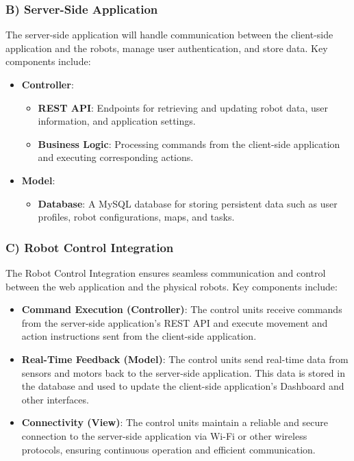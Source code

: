 \subsubsection{B) Server-Side Application}
\vspace{-2.5mm}
The server-side application will handle communication between the client-side application and the robots, manage user authentication, and store data. Key components include:
\vspace{-2mm}
\begin{itemize}
    \item \textbf{Controller}:
    \begin{itemize}
    \vspace{-1mm}
        \item \textbf{REST API}: Endpoints for retrieving and updating robot data, user information, and application settings.
        \vspace{-1mm}
        \item \textbf{Business Logic}: Processing commands from the client-side application and executing corresponding actions.
    \end{itemize}
    \vspace{-1mm}
    \item \textbf{Model}:
    \vspace{-1mm}
    \begin{itemize}
        \item \textbf{Database}: A MySQL database for storing persistent data such as user profiles, robot configurations, maps, and tasks.
    \end{itemize}
\end{itemize}

\subsubsection{C) Robot Control Integration}
\vspace{-2.5mm}
The Robot Control Integration ensures seamless communication and control between the web application and the physical robots.  Key components include:

\begin{itemize}
\vspace{-1mm}
    \item \textbf{Command Execution (Controller)}: The control units receive commands from the server-side application's REST API and execute movement and action instructions sent from the client-side application.
    \vspace{-1mm}
    \item \textbf{Real-Time Feedback (Model)}: The control units send real-time data from sensors and motors back to the server-side application. This data is stored in the database and used to update the client-side application's Dashboard and other interfaces.
    \vspace{-1mm}
    \item \textbf{Connectivity (View)}: The control units maintain a reliable and secure connection to the server-side application via Wi-Fi or other wireless protocols, ensuring continuous operation and efficient communication.
\end{itemize}

